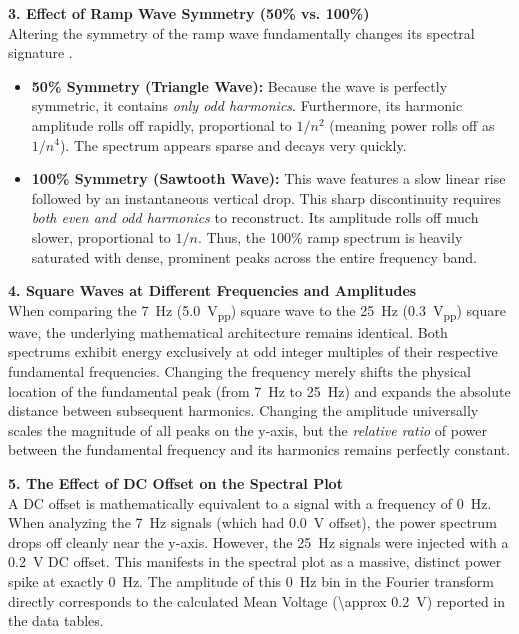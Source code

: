 \documentclass[11pt]{article}
\begin{document}
\textbf{3. Effect of Ramp Wave Symmetry (50\% vs. 100\%)}\\
Altering the symmetry of the ramp wave fundamentally changes its spectral signature .
\begin{itemize}
  \item \textbf{50\% Symmetry (Triangle Wave):} Because the wave is perfectly symmetric, it contains \textit{only odd harmonics}. Furthermore, its harmonic amplitude rolls off rapidly, proportional to $1/n^2$ (meaning power rolls off as $1/n^4$). The spectrum appears sparse and decays very quickly.
  \item \textbf{100\% Symmetry (Sawtooth Wave):} This wave features a slow linear rise followed by an instantaneous vertical drop. This sharp discontinuity requires \textit{both even and odd harmonics} to reconstruct. Its amplitude rolls off much slower, proportional to $1/n$. Thus, the 100\% ramp spectrum is heavily saturated with dense, prominent peaks across the entire frequency band.
\end{itemize}

\textbf{4. Square Waves at Different Frequencies and Amplitudes}\\
When comparing the \SI{7}{\hertz} (\SI{5.0}{V_{pp}}) square wave to the \SI{25}{\hertz} (\SI{0.3}{V_{pp}}) square wave, the underlying mathematical architecture remains identical. Both spectrums exhibit energy exclusively at odd integer multiples of their respective fundamental frequencies. Changing the frequency merely shifts the physical location of the fundamental peak (from \SI{7}{\hertz} to \SI{25}{\hertz}) and expands the absolute distance between subsequent harmonics. Changing the amplitude universally scales the magnitude of all peaks on the y-axis, but the \textit{relative ratio} of power between the fundamental frequency and its harmonics remains perfectly constant.

\textbf{5. The Effect of DC Offset on the Spectral Plot}\\
A DC offset is mathematically equivalent to a signal with a frequency of \SI{0}{\hertz}. When analyzing the \SI{7}{\hertz} signals (which had \SI{0.0}{\volt} offset), the power spectrum drops off cleanly near the y-axis. However, the \SI{25}{\hertz} signals were injected with a \SI{0.2}{\volt} DC offset. This manifests in the spectral plot as a massive, distinct power spike at exactly \SI{0}{\hertz}. The amplitude of this \SI{0}{\hertz} bin in the Fourier transform directly corresponds to the calculated Mean Voltage (\SI{\approx 0.2}{\volt}) reported in the data tables.
\end{document}
